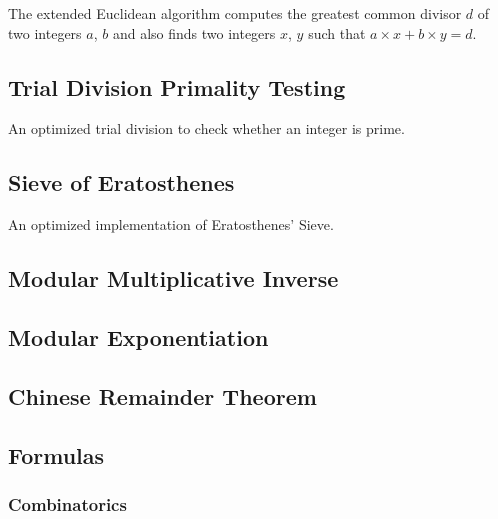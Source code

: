 \documentclass[10pt,a4paper,titlepage]{article}
\begin{document}
The extended Euclidean algorithm computes the greatest common divisor $d$ of two integers $a$, $b$ and also finds two integers $x$, $y$ such that $a\times x + b\times y = d$.


\subsection{Trial Division Primality Testing}
An optimized trial division to check whether an integer is prime.


\subsection{Sieve of Eratosthenes}
An optimized implementation of Eratosthenes' Sieve.


\subsection{Modular Multiplicative Inverse}


\subsection{Modular Exponentiation}


\subsection{Chinese Remainder Theorem}


\subsection{Formulas}

\subsubsection{Combinatorics}
\end{document}

